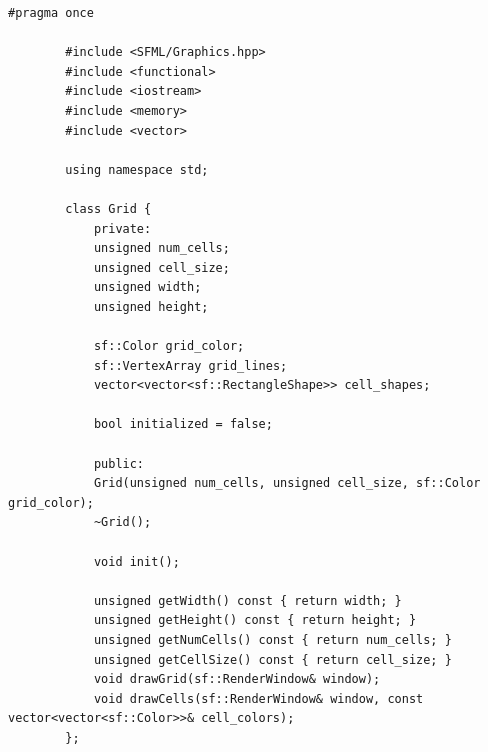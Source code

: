 \documentclass[14pt,a4paper]{extarticle}
\theoremstyle{plain}
\begin{document}
	\begin{lstlisting}[title=grid.h, gobble=16, breaklines=true, showspaces=false, showtabs=false, breakatwhitespace=true]
		#pragma once
		
		#include <SFML/Graphics.hpp>
		#include <functional>
		#include <iostream>
		#include <memory>
		#include <vector>
		
		using namespace std;
		
		class Grid {
			private:
			unsigned num_cells;
			unsigned cell_size;
			unsigned width;
			unsigned height;
			
			sf::Color grid_color;
			sf::VertexArray grid_lines;
			vector<vector<sf::RectangleShape>> cell_shapes;
			
			bool initialized = false;
			
			public:
			Grid(unsigned num_cells, unsigned cell_size, sf::Color grid_color);
			~Grid();
			
			void init();
			
			unsigned getWidth() const { return width; }
			unsigned getHeight() const { return height; }
			unsigned getNumCells() const { return num_cells; }
			unsigned getCellSize() const { return cell_size; }
			void drawGrid(sf::RenderWindow& window);
			void drawCells(sf::RenderWindow& window, const vector<vector<sf::Color>>& cell_colors);
		};
	\end{lstlisting}
	
\end{document}
